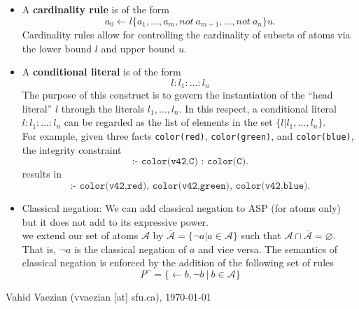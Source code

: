 \documentclass{article}
\begin{document}
\begin{itemize}
\item A \textbf{cardinality rule} is of the form \[a_0\leftarrow l\{a_1,\ldots,a_m, not \ a_{m+1}, \ldots, not \ a_n\}u. \]
Cardinality rules allow for controlling the cardinality of subsets of atoms via the lower bound $l$ and upper bound $u$.

\item A \textbf{conditional literal} is of the form \[l:l_1:\ldots:l_n\]
The purpose of this construct is to govern the instantiation of the “head literal” $l$ through the literals $l_1,\ldots,l_n$. In this respect, a conditional literal $l:l_1:\ldots:l_n$ can be regarded as the list of elements in the set $\{l | l_1,\ldots,l_n\}$.\\
For example, given three facts \texttt{color(red)}, \texttt{color(green)}, and \texttt{color(blue)}, the integrity constraint
\[\texttt{:- color(v42,C) : color(C).}\] results in \[\texttt{:- color(v42,red), color(v42,green), color(v42,blue).}\]

\item Classical negation: We can add classical negation to ASP (for atoms only) but it does not add to its expressive power.\\
we extend our set of atoms $\mathcal{A}$ by $\overline{\mathcal{A}}=\{\neg a|a\in \mathcal{A}\}$ such that $ \mathcal{A}\cap  \overline{\mathcal{A}}= \varnothing$. That is, $\neg a$ is the classical negation of $a$ and vice versa. The semantics of classical negation is enforced by the addition of the following set of rules
\[P^\neg=\{\leftarrow b,\neg b \ |\  b\in \mathcal{A} \}\]
\end{itemize}
 


\begin{flushright}
	\small{Vahid Vaezian (vvaezian [at] sfu.ca), \today}
\end{flushright}
\end{document}
